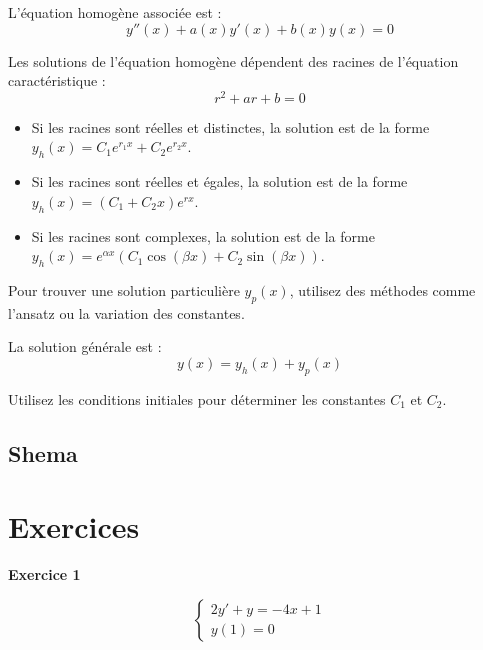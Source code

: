\documentclass{article}
\newcommand{\exo}[1]{
    \vspace{5mm}
    \textbf{Exercice #1}
    \hrulefill
}
\begin{document}
L'équation homogène associée est :
\begin{equation}
    y''(x) + a(x)y'(x) + b(x)y(x) = 0
\end{equation}

Les solutions de l'équation homogène dépendent des racines de l'équation caractéristique :
\begin{equation}
    r^2 + ar + b = 0
\end{equation}

\begin{itemize}
    \item Si les racines sont réelles et distinctes, la solution est de la forme $y_h(x) = C_1 e^{r_1 x} + C_2 e^{r_2 x}$.
    \item Si les racines sont réelles et égales, la solution est de la forme $y_h(x) = (C_1 + C_2 x)e^{r x}$.
    \item Si les racines sont complexes, la solution est de la forme $y_h(x) = e^{\alpha x}(C_1 \cos(\beta x) + C_2 \sin(\beta x))$.
\end{itemize}

Pour trouver une solution particulière $y_p(x)$, utilisez des méthodes comme l'ansatz ou la variation des constantes.

La solution générale est :
\begin{equation}
    y(x) = y_h(x) + y_p(x)
\end{equation}

Utilisez les conditions initiales pour déterminer les constantes $C_1$ et $C_2$.



\subsection*{Shema}







\section{Exercices}


\exo{1}

\begin{equation*}
\begin{cases}
2y' + y = -4x+1\\
y(1)=0 
\end{cases}
\end{equation*}
\end{document}
